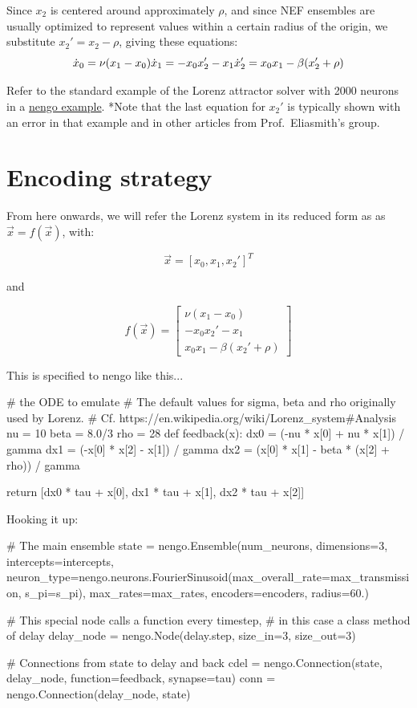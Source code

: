 \documentclass{report}
\begin{document}
Since \(x_2\) is centered around approximately \(\rho\), and since NEF
ensembles are usually optimized to represent values within a certain
radius of the origin, we substitute \(x_2' = x_2 - \rho\), giving these
equations: \[
\dot{x}_0 = \nu(x_1 - x_0) \\
\dot{x}_1 = - x_0 x_2' - x_1\\
\dot{x}_2' = x_0 x_1 - \beta (x_2' + \rho)
\]

Refer to the standard example of the Lorenz attractor solver with 2000
neurons in a
\href{https://github.com/nengo/nengo/blob/master/examples/dynamics/lorenz_attractor.ipynb}{nengo
example}. *Note that the last equation for \(x_2'\) is typically shown
with an error in that example and in other articles from
Prof.~Eliasmith's group.

\section{Encoding strategy}\label{encoding-strategy}

From here onwards, we will refer the Lorenz system in its reduced form
as as \(\vec x = f(\vec x)\), with:

\[
\vec x = [x_0, x_1, x_2']^T
\]

and

\[
f(\vec x) = \left[
\begin{array}{c}
\nu(x_1 - x_0) \\
- x_0 x_2'- x_1 \\
x_0 x_1 - \beta (x_2' + \rho)
\end{array}
\right]
\]

This is specified to nengo like this...
\begin{python}
# the ODE to emulate
# The default values for sigma, beta and rho originally used by Lorenz.
# Cf. https://en.wikipedia.org/wiki/Lorenz_system#Analysis
nu = 10
beta = 8.0/3
rho = 28
def feedback(x):
    dx0 = (-nu * x[0] + nu * x[1]) / gamma
    dx1 = (-x[0] * x[2] - x[1]) / gamma
    dx2 = (x[0] * x[1] - beta * (x[2] + rho)) / gamma

    return [dx0 * tau + x[0],
            dx1 * tau + x[1],
            dx2 * tau + x[2]]
\end{python}

Hooking it up:
\begin{python}
# The main ensemble
state = nengo.Ensemble(num_neurons, dimensions=3,
    intercepts=intercepts,
    neuron_type=nengo.neurons.FourierSinusoid(max_overall_rate=max_transmission,
                                              s_pi=s_pi),
    max_rates=max_rates,
    encoders=encoders, radius=60.)

# This special node calls a function every timestep,
# in this case a class method of delay
delay_node = nengo.Node(delay.step, size_in=3, size_out=3)

# Connections from state to delay and back
cdel = nengo.Connection(state, delay_node,
                        function=feedback, synapse=tau)
conn = nengo.Connection(delay_node, state)
\end{python}
\end{document}
